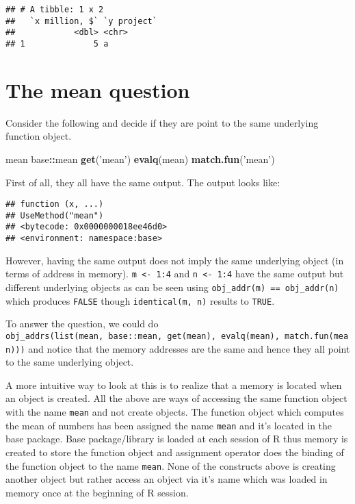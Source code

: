 \documentclass[]{book}
\newenvironment{Shaded}{\begin{snugshade}}{\end{snugshade}}
\newcommand{\KeywordTok}[1]{\textcolor[rgb]{0.13,0.29,0.53}{\textbf{#1}}}
\newcommand{\NormalTok}[1]{#1}
\newcommand{\OperatorTok}[1]{\textcolor[rgb]{0.81,0.36,0.00}{\textbf{#1}}}
\newcommand{\StringTok}[1]{\textcolor[rgb]{0.31,0.60,0.02}{#1}}
\begin{document}
\begin{verbatim}
## # A tibble: 1 x 2
##   `x million, $` `y project`
##            <dbl> <chr>      
## 1              5 a
\end{verbatim}

\hypertarget{the-mean-question}{%
\section{The mean question}\label{the-mean-question}}

Consider the following and decide if they are point to the same underlying function object.

\begin{Shaded}
\begin{Highlighting}[]
\NormalTok{mean}
\NormalTok{base}\OperatorTok{::}\NormalTok{mean}
\KeywordTok{get}\NormalTok{(}\StringTok{'mean'}\NormalTok{)}
\KeywordTok{evalq}\NormalTok{(mean)}
\KeywordTok{match.fun}\NormalTok{(}\StringTok{'mean'}\NormalTok{)}
\end{Highlighting}
\end{Shaded}

First of all, they all have the same output. The output looks like:

\begin{verbatim}
## function (x, ...) 
## UseMethod("mean")
## <bytecode: 0x0000000018ee46d0>
## <environment: namespace:base>
\end{verbatim}

However, having the same output does not imply the same underlying object (in terms of address in memory). \texttt{m\ \textless{}-\ 1:4} and \texttt{n\ \textless{}-\ 1:4} have the same output but different underlying objects as can be seen using \texttt{obj\_addr(m)\ ==\ obj\_addr(n)} which produces \texttt{FALSE} though \texttt{identical(m,\ n)} results to \texttt{TRUE}.

To answer the question, we could do \texttt{obj\_addrs(list(mean,\ base::mean,\ get(\textquotesingle{}mean\textquotesingle{}),\ evalq(mean),\ match.fun(\textquotesingle{}mean\textquotesingle{})))} and notice that the memory addresses are the same and hence they all point to the same underlying object.

A more intuitive way to look at this is to realize that a memory is located when an object is created. All the above are ways of accessing the same function object with the name \texttt{mean} and not create objects. The function object which computes the mean of numbers has been assigned the name \texttt{mean} and it's located in the base package. Base package/library is loaded at each session of R thus memory is created to store the function object and assignment operator does the binding of the function object to the name \texttt{mean}. None of the constructs above is creating another object but rather access an object via it's name which was loaded in memory once at the beginning of R session.
\end{document}

